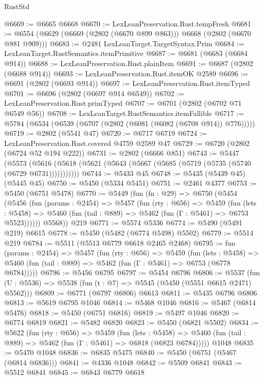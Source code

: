 \begin{lexlean}{RustStd}
\begin{coremodule}
@6669 := @6665 @6668
@6670 := LexLeanPreservation.Rust.tempFresh
@6681 := @6554 (@6629 (@6669 (@2802 (@6670 @899 @863))) @6668 (@2802 (@6670 @881 @909)))
@6683 := @2481 LexLeanTarget.TargetSyntax.Prim
@6684 := LexLeanTarget.RustSemantics.itemPrimitive
@6687 := @6681 (@6683 (@6684 @914))
@6688 := LexLeanPreservation.Rust.plainItem
@6691 := @6687 (@2802 (@6688 @914))
@6693 := LexLeanPreservation.Rust.itemOK @2589
@6696 := @6691 (@2802 (@6693 @914))
@6697 := LexLeanPreservation.Rust.itemTyped
@6701 := @6696 (@2802 (@6697 @914 @6549))
@6702 := LexLeanPreservation.Rust.primTyped
@6707 := @6701 (@2802 (@6702 @71 @6549 @56))
@6708 := LexLeanTarget.RustSemantics.itemFallible
@6717 := @5784 (@6534 (@6539 (@6707 (@2802 (@6081 (@6082 (@6708 @914)) @776)))))
@6719 := @2802 (@5541 @47)
@6720 := @6717 @6719
@6724 := LexLeanPreservation.Rust.covered @4759 @2589 @47
@6729 := @6720 (@2802 (@6724 @52 @194 @222))
@6731 := @2802 (@6666 @851)
@6743 := @5447
    (@5573 (@5616 (@5618 (@5621 (@5643 (@5667 (@5685 (@5719 (@5735 (@5740 (@6729 @6731)))))))))))
@6744 := @5433 @45
@6748 := @5435 (@5439 @45) (@5445 @45)
@6750 := @5450 (@5334 @5451)
@6751 := @2461 @4377
@6753 := @5450 (@6751 @5478)
@6770 := @5449
    (fun (fn : @29) =>
    @6750
      (@5454
        (@5456
          (fun (params : @2454) =>
          @5457
            (fun (rty : @656) =>
            @5459
              (fun (lets : @5458) =>
              @5460 (fun (tail : @889) => @5462 (fun (Γ : @5461) => @6753 @5523))))))
        @5568))
    @219
@6771 := @5574 @5336
@6774 := @5490 (@5491 @219) @6615
@6778 := @5450 (@5482 (@6774 @5498) @5502)
@6779 := @5514 @219
@6784 := @5511 (@5513 @6779 @6618 @2465 @2468)
@6795 := fun (params : @2454) =>
  @5457
    (fun (rty : @656) =>
    @5459
      (fun (lets : @5458) =>
      @5460 (fun (tail : @889) => @5462 (fun (Γ : @5461) => @6753 (@6778 @6784)))))
@6796 := @5456 @6795
@6797 := @5454 @6796
@6806 := @5537 (fun (U : @5536) => @5538 (fun (t : @7) => @5545 (@5450 (@5551 @6615 @2471) @5562)))
@6809 := @6771 (@6797 @6806) @6613
@6811 := @5435 @6796 @6806
@6813 := @5619 @6795 @1046
@6814 := @5468 @1046
@6816 := @5467 (@6814 @5476)
@6818 := @5450 (@6751 @6816)
@6819 := @5497 @1046
@6820 := @6774 @6819
@6821 := @5482 @6820
@6823 := @5450 (@6821 @5502)
@6834 := @5622
    (fun (rty : @656) =>
    @5459
      (fun (lets : @5458) =>
      @5460 (fun (tail : @889) => @5462 (fun (Γ : @5461) => @6818 (@6823 @6784)))))
    @1048
@6835 := @5470 @1048
@6836 := @6835 @5475
@6840 := @5450 (@6751 (@5467 (@6814 @6836)))
@6841 := @4336 @1048
@6842 := @5509 @6841
@6843 := @5512 @6841
@6845 := @6843 @6779 @6618

\end{coremodule}
\end{lexlean}
